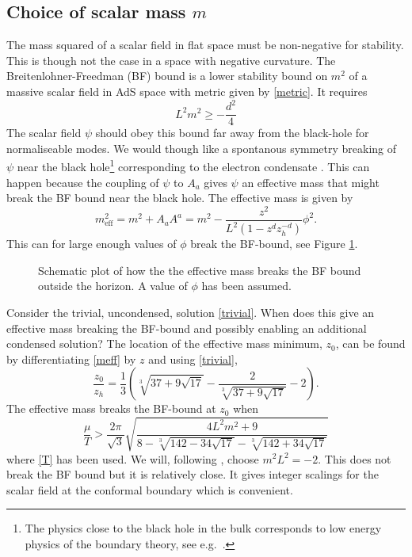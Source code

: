 \documentclass[12pt]{report}
\newcommand{\At}{\ensuremath{{\phi}}}
\begin{document}
\subsection{Choice of scalar mass $m$}
The mass squared of a scalar field in flat space must be non-negative for stability. This is though not the case in a space with negative curvature. The Breitenlohner-Freedman (BF) bound is a lower stability bound on $m^2$ of a massive scalar field in AdS space with metric given by \eqref{metric}. It requires \cite{Kleban:2004bv}
\begin{equation}
 L^2m^2\geq-\frac{d^2}{4}\label{BF}
\end{equation}
The scalar field $\psi$ should obey this bound far away from the black-hole for normaliseable modes. We would though like a spontanous symmetry breaking of $\psi$ near the black hole\footnote{The physics close to the black hole in the bulk corresponds to low energy physics of the boundary theory, see e.g.~\cite{McGreevy:2009xe}.} corresponding to the electron condensate \cite{Gubser:2008px}. This can happen because the coupling of $\psi$ to $A_a$ gives $\psi$ an effective mass that might break the BF bound near the black hole. The effective mass is given by
\begin{equation}
 m_{\mathrm{eff}}^2=m^2+A_aA^a
=m^2-\frac{z^2}{L^2(1-z^dz_h^{-d})}\At^2.
\label{meff}
\end{equation}
This can for large enough values of $\At$ break the BF-bound, see Figure \ref{BF}.
\begin{figure}
\centering

\caption{Schematic plot of how the the effective mass breaks the BF bound outside the horizon. A value of $\At$ has been assumed.\label{BF}}
\end{figure}
Consider the trivial, uncondensed, solution \eqref{trivial}. When does this give an effective mass breaking the BF-bound and possibly enabling an additional condensed solution? The location of the effective mass minimum, $z_0$, can be found by differentiating \eqref{meff} by $z$ and using \eqref{trivial},
\begin{equation}
\frac{z_0}{z_h}=\frac{1}{3} \left(\sqrt[3]{37+9 \sqrt{17}}-\frac{2}{\sqrt[3]{37+9 \sqrt{17}}}-2\right).
\end{equation}
The effective mass breaks the BF-bound at $z_0$ when
\begin{equation}
 \frac{\mu}{T}>
\frac{2\pi }{\sqrt{3}} \sqrt{\frac{4 L^2 m^2+9}{8-\sqrt[3]{142-34
   \sqrt{17}}-\sqrt[3]{142+34 \sqrt{17}}}}
\end{equation}
where \eqref{T} has been used. We will, following \cite{hartnoll8, horowitz}, choose $m^2L^2=-2$. This does not break the BF bound but it is relatively close. It gives integer scalings for the scalar field at the conformal boundary which is convenient.%
\end{document}
